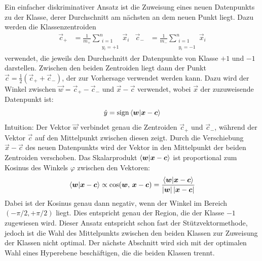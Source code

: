 			Ein einfacher diskriminativer Ansatz ist \zB die Zuweisung eines neuen Datenpunkts zu der Klasse, derer Durchschnitt am nächsten an dem neuen Punkt liegt. Dazu werden die Klassenzentroiden
			\begin{align}
				\vec{c}_+ &= \frac{1}{m_+} \sum_{\substack{i = 1 \\ y_i = +1}}^{n} \vec{x}_i
				&
				\vec{c}_- &= \frac{1}{m_-} \sum_{\substack{i = 1 \\ y_i = -1}}^{n} \vec{x}_i
			\end{align}
			verwendet, die jeweils den Durchschnitt der Datenpunkte von Klasse \(+1\) und \(-1\) darstellen. Zwischen den beiden Zentroiden liegt dann der Punkt \( \vec{c} = \frac{1}{2} (\vec{c}_+ + \vec{c}_-) \), der zur Vorhersage verwendet werden kann. Dazu wird der Winkel zwischen \( \vec{w} = \vec{c}_+ - \vec{c}_- \) und \( \vec{x} - \vec{c} \) verwendet, wobei \(\vec{x}\) der zuzuweisende Datenpunkt ist:
			\begin{equation}
				\hat{y} = \operatorname{sign} \braket{\bm{w}}{\bm{x} - \bm{c}}
			\end{equation}
			Intuition: Der Vektor \( \vec{w} \) verbindet genau die Zentroiden \(\vec{c}_+\) und \(\vec{c}_-\), während der Vektor \(\vec{c}\) auf den Mittelpunkt zwischen diesen zeigt. Durch die Verschiebung \( \vec{x} - \vec{c} \) des neuen Datenpunkts wird der Vektor in den Mittelpunkt der beiden Zentroiden verschoben. Das Skalarprodukt \( \braket{\bm{w}}{\bm{x} - \bm{c}} \) ist proportional zum Kosinus des Winkels \(\varphi\) zwischen den Vektoren:
			\begin{equation}
				\braket{\bm{w}}{\bm{x} - \bm{c}} \propto \cos(\bm{w},\, \bm{x} - \bm{c}) = \frac{\braket{\bm{w}}{\bm{x} - \bm{c}}}{\lvert \bm{w} \rvert \, \lvert \bm{x} - \bm{c} \rvert}
			\end{equation}
			Dabei ist der Kosinus genau dann negativ, wenn der Winkel im Bereich \( (-\pi/2, +\pi/2) \) liegt. Dies entspricht genau der Region, die der Klasse \(-1\) zugewiesen wird. Dieser Ansatz entspricht schon fast der Stützvektormethode, jedoch ist die Wahl des Mittelpunkts zwischen den beiden Klassen zur Zuweisung der Klassen nicht optimal. Der nächste Abschnitt wird sich mit der optimalen Wahl eines Hyperebene beschäftigen, die die beiden Klassen trennt.

